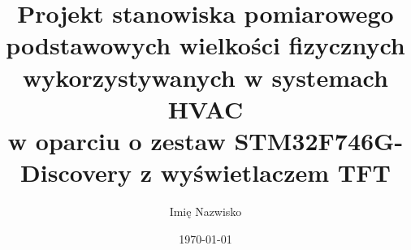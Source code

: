 \documentclass[a4paper,12pt]{article}
\title{Projekt stanowiska pomiarowego podstawowych wielkości fizycznych wykorzystywanych w systemach HVAC
\\\large w oparciu o zestaw STM32F746G-Discovery z wyświetlaczem TFT}
\author{Imię Nazwisko}
\date{\today}
\begin{document}
\maketitle



\tableofcontents








\cite{Analog_0_10V_Guideline}



\printbibliography
\end{document}
